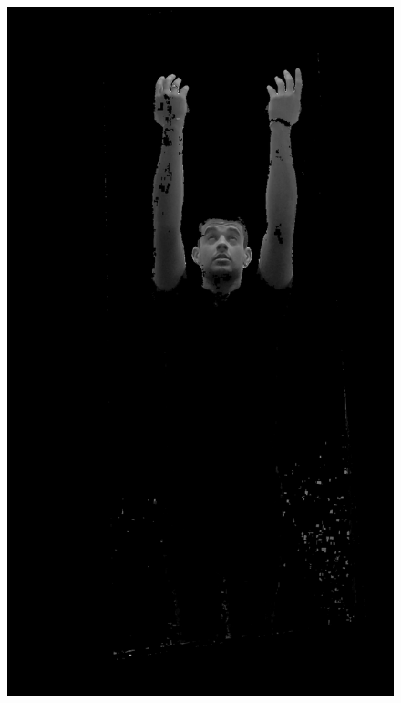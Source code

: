 \begin{figure}[!htbp]
    \centering
        \begin{minipage}{\sizeImg\textwidth}
            \includegraphics[width=\textwidth]{figuras/mao_barra/gray.png}
        \end{minipage}
        \begin{minipage}{\sizeImg\textwidth}

\end{minipage}
\end{figure}
